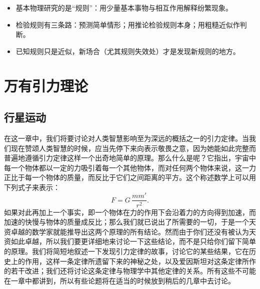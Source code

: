 \begin{summarybox}[本节要点]
  \begin{itemize}
    \item 基本物理研究的是“规则”：用少量基本事物与相互作用解释纷繁现象。
    \item 检验规则有三条路：预测简单情形；用推论检验规则本身；用粗糙近似作判断。
    \item 已知规则只是近似，新场合（尤其规则失效处）才是发现新规则的地方。
  \end{itemize}
\end{summarybox}

\clearpage

\setcounter{chapter}{6}
\chapter{万有引力理论}


\section{行星运动}

在这一章中，我们将要讨论对人类智慧影响至为深远的概括之一的引力定律。当我们现在赞颂人类智慧的时候，应当先停下来向表示敬畏之意，因为她能如此完整而普遍地遵循引力定律这样一个出奇地简单的原理。那么什么是呢？它指出，宇宙中每一个物体都以一定的力吸引着每一个其他物体，而对任何两个物体来说，这一力正比于每一个物体的质量，而反比于它们之间距离的平方。这个称述数学上可以用下列式子来表示：
\begin{equation*}
F=G\,\frac{mm'}{r^2}.
\end{equation*}
如果对此再加上一个事实，即一个物体在力的作用下会沿着力的方向得到加速，而加速的快慢与物体的质量成反比；那么我们就已说出了所需要的一切，于是一个天资卓越的数学家就能推导出这两个原理的所有结论。然而由于你们还没有被认为天资如此卓越，所以我们要更详细地来讨论一下这些结论，而不是只给你们留下简单的原理。我们将简短地叙述一下发现引力定律的故事，讨论它的某些结果，它在历史上的作用，这样一条定律所遗留下来的神秘之处，以及爱因斯坦对这条定律所作的若干改进；我们还将讨论这条定律与物理学中其他定律的关系。所有这些不可能在一章中都讲到，所以有些论题将在适当的时候放到稍后的几章中去讨论。

